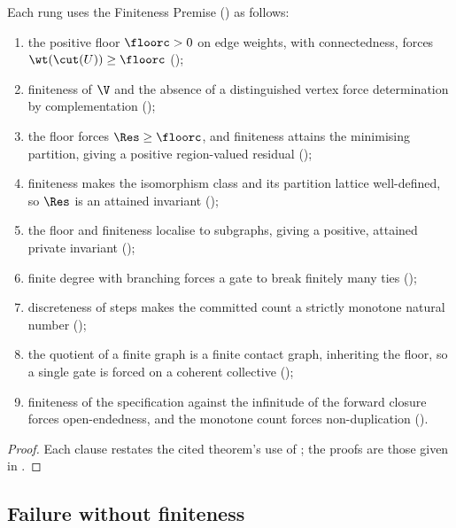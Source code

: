 \begin{proposition}
\label{prop:dependence}
Each rung uses the Finiteness Premise \textup{(}\textup{)} as
follows:
\begin{enumerate}[label=\textup{(T\arabic*)},leftmargin=3em,start=0]
\item the positive floor $\floorc>0$ on edge weights, with connectedness, forces
$\wt(\cut(U))\ge\floorc$ \textup{(}\textup{)};
\item finiteness of $\V$ and the absence of a distinguished vertex force
determination by complementation \textup{(}\textup{)};
\item the floor forces $\Res\ge\floorc$, and finiteness attains the minimising
partition, giving a positive region-valued residual
\textup{(}\textup{)};
\item finiteness makes the isomorphism class and its partition lattice
well-defined, so $\Res$ is an attained invariant
\textup{(}\textup{)};
\item the floor and finiteness localise to subgraphs, giving a positive,
attained private invariant \textup{(}\textup{)};
\item finite degree with branching forces a gate to break finitely many ties
\textup{(}\textup{)};
\item discreteness of steps makes the committed count a strictly monotone natural
number \textup{(}\textup{)};
\item the quotient of a finite graph is a finite contact graph, inheriting the
floor, so a single gate is forced on a coherent collective
\textup{(}\textup{)};
\item finiteness of the specification against the infinitude of the forward
closure forces open-endedness, and the monotone count forces non-duplication
\textup{(}\textup{)}.
\end{enumerate}
\end{proposition}

\begin{proof}
Each clause restates the cited theorem's use of ; the proofs are
those given in .
\end{proof}

\subsection{Failure without finiteness}

